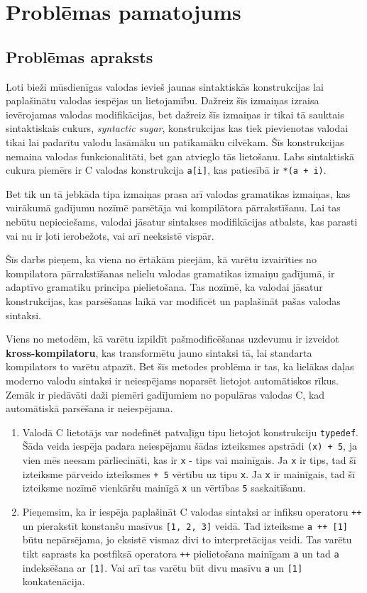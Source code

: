 \section{Problēmas pamatojums}

\subsection{Problēmas apraksts}
Ļoti bieži mūsdienīgas valodas ievieš jaunas sintaktiskās konstrukcijas lai paplašinātu valodas iespējas un lietojamību. Dažreiz šīs izmaiņas izraisa ievērojamas valodas modifikācijas, bet dažreiz šīs izmaiņas ir tikai tā sauktais sintaktiskais cukurs, \emph{syntactic sugar}, konstrukcijas kas tiek pievienotas valodai tikai lai padarītu valodu lasāmāku un patīkamāku cilvēkam. Šīs konstrukcijas nemaina valodas funkcionalitāti, bet gan atvieglo tās lietošanu. Labs sintaktiskā cukura piemērs ir C valodas konstrukcija \verb|a[i]|, kas patiesībā ir \verb|*(a + i)|.

Bet tik un tā jebkāda tipa izmaiņas prasa arī valodas gramatikas izmaiņas, kas vairākumā gadījumu nozīmē parsētāja vai kompilātora pārrakstīšanu. Lai tas nebūtu nepieciešams, valodai jāsatur sintakses modifikācijas atbalsts, kas parasti vai nu ir ļoti ierobežots, vai arī neeksistē vispār.

Šīs darbs pieņem, ka viena no ērtākām pieejām, kā varētu izvairīties no kompilatora pārrakstīšanas nelielu valodas gramatikas izmaiņu gadījumā, ir adaptīvo gramatiku principa pielietošana. Tas nozīmē, ka valodai jāsatur konstrukcijas, kas parsēšanas laikā var modificēt un paplašināt pašas valodas sintaksi. 

Viens no metodēm, kā varētu izpildīt pašmodificēšanas uzdevumu ir izveidot \textbf{kross-kompilatoru}, kas transformētu jauno sintaksi tā, lai standarta kompilators to varētu atpazīt. Bet šīs metodes problēma ir tas, ka lielākas daļas moderno valodu sintaksi ir neiespējams noparsēt lietojot automātiskos rīkus. Zemāk ir piedāvāti daži piemēri gadījumiem no populāras valodas C, kad automātiskā parsēšana ir neiespējama.

\begin{enumerate}
\item
Valodā C lietotājs var nodefinēt patvaļīgu tipu lietojot konstrukciju \verb|typedef|. Šāda veida iespēja padara neiespējamu šādas izteiksmes apstrādi \verb|(x) + 5|, ja vien mēs neesam pārliecināti, kas ir \verb|x| - tips vai mainīgais. Ja \verb|x| ir tips, tad šī izteiksme pārveido izteiksmes \verb|+ 5| vērtību uz tipu \verb|x|. Ja \verb|x| ir mainīgais, tad šī izteiksme nozīmē vienkāršu mainīgā \verb|x| un vērtības \verb|5| saskaitīšanu. 
\item
Pieņemsim, ka ir iespēja paplašināt C valodas sintaksi ar infiksu operatoru \verb|++| un pierakstīt konstanšu masīvus \verb|[1, 2, 3]| veidā. Tad izteiksme \verb|a ++ [1]| būtu nepārsējama, jo eksistē vismaz divi to interpretācijas veidi. Tas varētu tikt saprasts ka postfiksā operatora \verb|++| pielietošana mainīgam \verb|a| un tad \verb|a| indeksēšana ar \verb|[1]|. Vai arī tas varētu būt divu masīvu \verb|a| un \verb|[1]| konkatenācija.
\end{enumerate}

